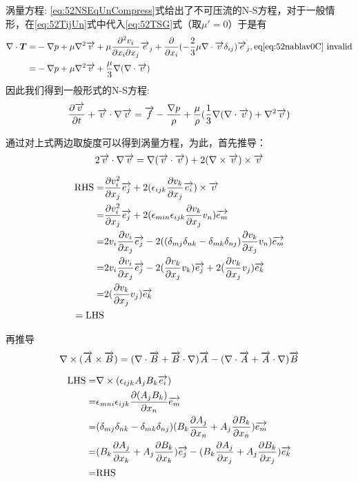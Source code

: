 涡量方程:
\eqref{eq:52NSEqUnCompress}式给出了不可压流的N-S方程，对于一般情形，在\eqref{eq:52TijUn}式中代入\eqref{eq:52TSG}式（取$\mu'=0$）于是有
\begin{align}
\nabla\cdot \bm{T} = & -\nabla p+\mu \nabla^2 \overrightarrow{v} +\mu \frac{\partial^2 v_i}{\partial x_i \partial x_j} \overrightarrow{e}_j + \frac{\partial }{\partial x_i} (-\frac{2}{3}\mu \nabla\cdot \overrightarrow{v}\delta_{ij})\overrightarrow{e}_j, \text{eq\eqref{eq:52nablav0C} invalid}\\
= & -\nabla p+\mu \nabla^2 \overrightarrow{v} + \frac{\mu}{3}\nabla(\nabla \cdot \overrightarrow{v})
\end{align}
因此我们得到一般形式的N-S方程:
\begin{equation}\label{eq:71generalNS}
\frac{\partial \overrightarrow{v}}{\partial t}+\overrightarrow{v}\cdot\nabla\overrightarrow{v}=\overrightarrow{f}-\frac{\nabla p}{\rho}+\frac{\mu}{\rho} (\frac{1}{3}\nabla(\nabla\cdot \overrightarrow{v})+\nabla^2 \overrightarrow{v})
\end{equation}

通过对上式两边取旋度可以得到涡量方程，为此，首先推导：
\begin{equation}\label{eq:71vvw}
2\overrightarrow{v}\cdot \nabla \overrightarrow{v}=\nabla (\overrightarrow{v}\cdot\overrightarrow{v}) + 2(\nabla\times \overrightarrow{v})\times \overrightarrow{v} 
\end{equation}

\begin{align*}
\text{RHS}=& \frac{\partial v_i^2}{\partial x_j} \overrightarrow{e_j} + 2(\epsilon_{ijk}\frac{\partial v_k}{\partial x_j}\overrightarrow{e_i})\times \overrightarrow{v}\\
=& \frac{\partial v_i^2}{\partial x_j} \overrightarrow{e_j} + 2(\epsilon_{min}\epsilon_{ijk}\frac{\partial v_k}{\partial x_j}v_n)\overrightarrow{e_m}\\
=& 2v_i\frac{\partial v_i}{\partial x_j} \overrightarrow{e_j} - 2((\delta_{mj}\delta_{nk}-\delta_{mk}\delta_{nj})\frac{\partial v_k}{\partial x_j}v_n)\overrightarrow{e_m}\\
=& 2v_i\frac{\partial v_i}{\partial x_j} \overrightarrow{e_j} - 2(\frac{\partial v_k}{\partial x_j}v_k)\overrightarrow{e_j}+2(\frac{\partial v_k}{\partial x_j}v_j)\overrightarrow{e_k}\\
=& 2(\frac{\partial v_k}{\partial x_j}v_j)\overrightarrow{e_k}\\
= \text{LHS}
\end{align*}

再推导
\begin{equation}
\nabla\times(\overrightarrow{A}\times \overrightarrow{B})=(\nabla\cdot \overrightarrow{B}+\overrightarrow{B}\cdot\nabla)\overrightarrow{A}-(\nabla\cdot \overrightarrow{A}+\overrightarrow{A}\cdot\nabla)\overrightarrow{B}
\end{equation}

\begin{align*}
\text{LHS}=&\nabla\times(\epsilon_{ijk}A_jB_k\overrightarrow{e_i})\\
=& \epsilon_{mni}\epsilon_{ijk}\frac{\partial (A_jB_k)}{\partial x_n}\overrightarrow{e_m}\\
=& (\delta_{mj}\delta_{nk}-\delta_{mk}\delta_{nj})(B_k\frac{\partial A_j}{\partial x_n}+A_j\frac{\partial B_k}{\partial x_n})\overrightarrow{e_m}\\
=&(B_k\frac{\partial A_j}{\partial x_k}+A_j\frac{\partial B_k}{\partial x_k})\overrightarrow{e_j}
-(B_k\frac{\partial A_j}{\partial x_j}+A_j\frac{\partial B_k}{\partial x_j})\overrightarrow{e_k}\\
=& \text{RHS}
\end{align*}

